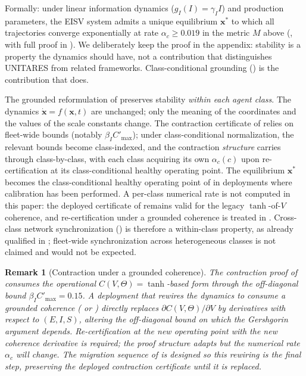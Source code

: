 \documentclass[11pt,twocolumn]{article}
\newtheorem{remark}[theorem]{Remark}
\newcommand{\eisv}{\ensuremath{\mathbf{x}}}
\newcommand{\cv}{\ensuremath{C(V,\Theta)}}
\begin{document}
Formally: under linear information dynamics
($g_I(I) = \gamma_I I$) and production parameters, the EISV
system admits a unique equilibrium $\eisv^*$ to which all
trajectories converge exponentially at rate
$\alpha_c \geq 0.019$ in the metric $M$ above
(, with full proof in
). We deliberately keep the proof in
the appendix: stability is a property the dynamics should have,
not a contribution that distinguishes UNITARES from related
frameworks. Class-conditional grounding
() is the contribution
that does.

The grounded reformulation of
 preserves stability \emph{within each agent
class}. The dynamics
$\dot{\eisv} = f(\eisv, t)$ are unchanged; only the meaning of
the coordinates and the values of the scale constants change.
The contraction certificate of  relies on
fleet-wide bounds (notably $\beta_I C'_{\max}$); under
class-conditional normalization, the relevant bounds become
class-indexed, and the contraction \emph{structure} carries
through class-by-class, with each class acquiring its own
$\alpha_c(c)$ upon re-certification at its class-conditional
healthy operating point. The equilibrium $\eisv^*$ becomes the
class-conditional healthy operating point of
 in deployments where calibration has been
performed. A per-class numerical rate is not computed in this
paper: the deployed certificate of 
remains valid for the legacy $\tanh$-of-$V$ coherence, and
re-certification under a grounded coherence is treated in
. Cross-class network
synchronization () is therefore a
within-class property, as already qualified in ;
fleet-wide synchronization across heterogeneous classes is not
claimed and would not be expected.

\begin{remark}[Contraction under a grounded coherence]
\label{rem:phase3-contraction}
The contraction proof of  consumes
the operational $\cv = \tanh$-based form through the off-diagonal
bound $\beta_I C'_{\max} = 0.15$. A deployment that rewires the
dynamics to consume a grounded coherence ( or
) directly replaces $\partial \cv / \partial V$ by
derivatives with respect to $(E, I, S)$, altering the off-diagonal
bound on which the Gershgorin argument depends. Re-certification
at the new operating point with the new coherence derivative is
required; the proof structure adapts but the numerical rate
$\alpha_c$ will change. The migration sequence of
 is designed so this rewiring is the final
step, preserving the deployed contraction certificate until it
is replaced.
\end{remark}
\end{document}
